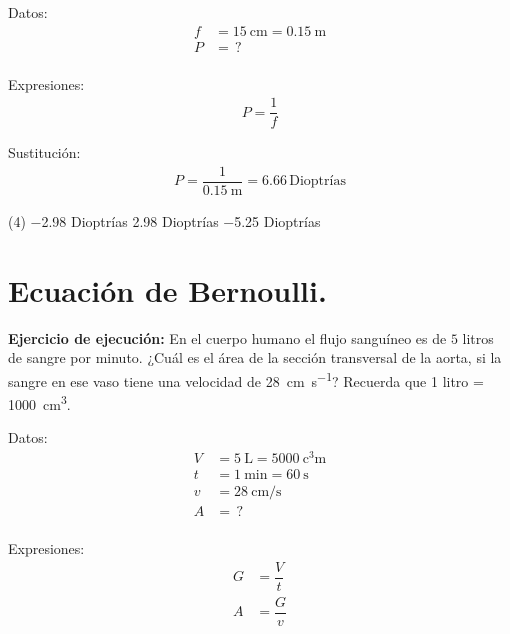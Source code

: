\documentclass[12pt, letter]{exam}
\begin{document}
\begin{questions}
    \begin{minipage}[t]{0.35\linewidth}
    Datos: 
    \begin{align*}
    f &= \SI{15}{\centi\meter} = \SI{0.15}{\meter} \\
    P &= \, ? \\
    \end{align*}
    \end{minipage}
    \hspace{1cm}
    \begin{minipage}[t]{0.4\linewidth}
    Expresiones:
    \begin{align*}
    P = \dfrac{1}{f}
    \end{align*}
    \end{minipage}

    Sustitución:
    \begin{align*}
    P = \dfrac{1}{\SI{0.15}{\meter}} = 6.66 \, \text{Dioptrías}
    \end{align*}

    \vspace{0.3cm}
    \begin{tasks}(4)
        \task \num{-2.98} Dioptrías
        \task \num{2.98} Dioptrías
        \task \num{-5.25} Dioptrías
        \task {}
    \end{tasks}

    \setcounter{section}{9}
    \section{Ecuación de Bernoulli.}

    \setcounter{question}{23} \question \label{Problema_01} \textbf{Ejercicio de ejecución: } En el cuerpo humano el flujo sanguíneo es de $5$ litros de sangre por minuto. ¿Cuál es el área de la sección transversal de la aorta, si la sangre en ese vaso tiene una velocidad de \SI{28}{\centi\meter\per\second}? Recuerda que 1 litro = \SI{1000}{\cubic\centi\meter}.

    \begin{minipage}[t]{0.35\linewidth}
    Datos: 
    \begin{align*}
    V &= \SI{5}{\liter} = \SI{5000}{\cubic\centi\meter} \\[0.3em]
    t &= \SI{1}{\minute} = \SI{60}{\second} \\[0.3em]
    v &= \SI{28}{\centi\meter\per\second} \\
    A &= \, ? \\
    \end{align*}
    \end{minipage}
    \hspace{1cm}
    \begin{minipage}[t]{0.4\linewidth}
    Expresiones:
    \begin{align*}
    G &= \dfrac{V}{t} \\[0.3em]
    A &= \dfrac{G}{v}
    \end{align*}
    \end{minipage}


\end{questions}
\end{document}
